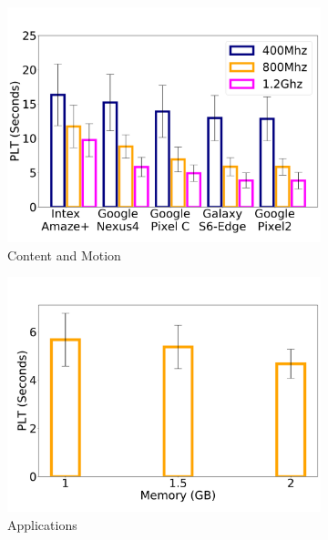 \begin{figure}
    \begin{subfigure}[b]{0.33\textwidth}
        \centering
        \includegraphics[width=1\linewidth]{sections/device-work/clock-device}
        \caption{Content and Motion}
    \end{subfigure}
    \begin{subfigure}[b]{0.33\textwidth}
        \centering
        \includegraphics[width=1\linewidth]{sections/device-work/plt-memory}
        \caption{Applications}
    \end{subfigure}%
    \begin{subfigure}[b]{0.33\textwidth}
        \centering

\end{subfigure}
\end{figure}

